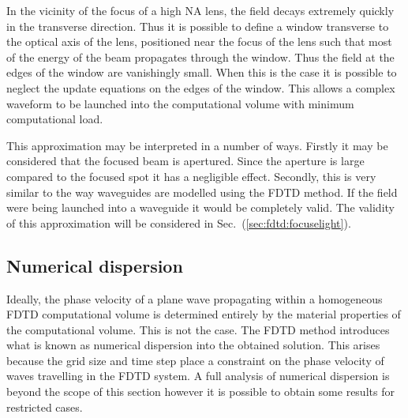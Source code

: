 \documentclass[a4paper, 12pt]{article}
\newcommand{\sect}[1]{Sec.\ (\ref{#1})}
\begin{document}
	In the vicinity of the focus of a high NA lens, the field decays
	extremely quickly in the transverse direction. Thus it is possible to
	define a window transverse to the optical axis of the lens, positioned
	near the focus of the lens such that most of the energy of the beam
	propagates through the window. Thus the field at the edges of the
	window are vanishingly small. When this is the case it is possible to
	neglect the update equations on the edges of the window. This allows a
	complex waveform to be launched into the computational volume with
	minimum computational load.
	
	This approximation may be interpreted in a number of ways. Firstly it
	may be considered that the focused beam is apertured. Since the aperture is large compared to the focused spot
	it has a negligible effect. Secondly, this is very similar to the way
	waveguides are modelled using the FDTD method. If the field were being launched into a
	waveguide it would be completely valid. The validity of this
	approximation will be considered in \sect{sec:fdtd:focuselight}.
	\subsection{Numerical dispersion}
	\label{sec:fdtd:numdisp}
	Ideally, the phase velocity of a plane wave propagating within a
	homogeneous FDTD computational volume is determined entirely by the
	material properties of the computational volume. This is not the
	case. The FDTD method introduces what is known as numerical dispersion
	into the obtained solution. This arises because the grid size and time
	step place a constraint on the phase velocity of waves travelling in
	the FDTD system. A full analysis of numerical dispersion is beyond the
	scope of this section however it is possible to obtain some results
	for restricted cases. 
	
\end{document}
